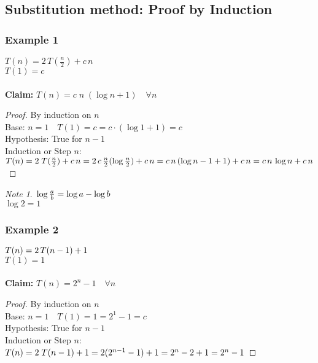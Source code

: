 \documentclass{article}
\theoremstyle{definition}
\theoremstyle{remark}
\newtheorem{note}{Note}[section]
\theoremstyle{plain}
\begin{document}
\subsection{Substitution method: Proof by Induction}
\subsubsection{Example 1}
$T(n) = 2\, T(\frac{n}{2}) + c\,n$\\
$T(1) = c$\\\\

\textbf{Claim:} $T(n) = c\; n \; (\log n + 1) \quad \forall n$

\begin{proof} 
By induction on $n$\\
Base: $n = 1 \quad  T(1) = c = c \cdot (\log 1 + 1) = c$\\
Hypothesis: True for $n-1$\\
Induction or Step $n$:\\
$T(n) = 2\;T(\frac{n}{2}) + c\,n\\
= 2\,c\,\frac{n}{2} (\log{\frac{n}{2}}) + c\,n\\
= c\,n\,(\log n - 1 + 1) + c\,n\\
= c\,n\,\log n + c\,n$
\end{proof}

\begin{note}
$\\\log {\frac{a}{b}} = \log a - \log b$\\
$\log 2 = 1$
\end{note}

\subsubsection{Example 2}

$\\T(n) = 2\, T(n-1) + 1$\\
$T(1) = 1$\\\\

\textbf{Claim:} $T(n) = 2^n - 1 \quad \forall n$

\begin{proof} 
By induction on $n$\\
Base: $n = 1 \quad  T(1) = 1 = 2^1 - 1 = c$\\
Hypothesis: True for $n-1$\\
Induction or Step $n$:\\
$T(n) = 2\;T(n-1) + 1\\
= 2 (2^{n-1} -1) + 1\\
= 2^n - 2 + 1\\
= 2^n -1$
\end{proof}
\end{document}
